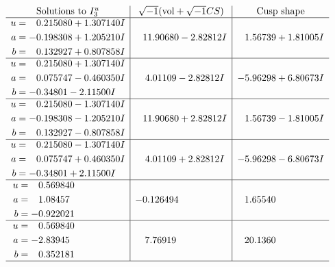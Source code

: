 \documentclass[1p]{elsarticle_modified}
\theoremstyle{definition}
\newcommand{\I}{\sqrt{-1}}
\begin{document}
$$\begin{array}{c|c|c}  
\text{Solutions to }I^u_{3}& \I (\text{vol} + \sqrt{-1}CS) & \text{Cusp shape}\\
 \hline 
\begin{aligned}
u &= \phantom{-}0.215080 + 1.307140 I \\
a &= -0.198308 + 1.205210 I \\
b &= \phantom{-}0.132927 + 0.807858 I\end{aligned}
 & \phantom{-}11.90680 - 2.82812 I & \phantom{-}1.56739 + 1.81005 I \\ \hline\begin{aligned}
u &= \phantom{-}0.215080 + 1.307140 I \\
a &= \phantom{-}0.075747 - 0.460350 I \\
b &= -0.34801 - 2.11500 I\end{aligned}
 & \phantom{-}4.01109 - 2.82812 I & -5.96298 + 6.80673 I \\ \hline\begin{aligned}
u &= \phantom{-}0.215080 - 1.307140 I \\
a &= -0.198308 - 1.205210 I \\
b &= \phantom{-}0.132927 - 0.807858 I\end{aligned}
 & \phantom{-}11.90680 + 2.82812 I & \phantom{-}1.56739 - 1.81005 I \\ \hline\begin{aligned}
u &= \phantom{-}0.215080 - 1.307140 I \\
a &= \phantom{-}0.075747 + 0.460350 I \\
b &= -0.34801 + 2.11500 I\end{aligned}
 & \phantom{-}4.01109 + 2.82812 I & -5.96298 - 6.80673 I \\ \hline\begin{aligned}
u &= \phantom{-}0.569840\phantom{ +0.000000I} \\
a &= \phantom{-}1.08457\phantom{ +0.000000I} \\
b &= -0.922021\phantom{ +0.000000I}\end{aligned}
 & -0.126494\phantom{ +0.000000I} & \phantom{-}1.65540\phantom{ +0.000000I} \\ \hline\begin{aligned}
u &= \phantom{-}0.569840\phantom{ +0.000000I} \\
a &= -2.83945\phantom{ +0.000000I} \\
b &= \phantom{-}0.352181\phantom{ +0.000000I}\end{aligned}
 & \phantom{-}7.76919\phantom{ +0.000000I} & \phantom{-}20.1360\phantom{ +0.000000I}\\
 \hline 
 \end{array}$$\newpage
\end{document}
